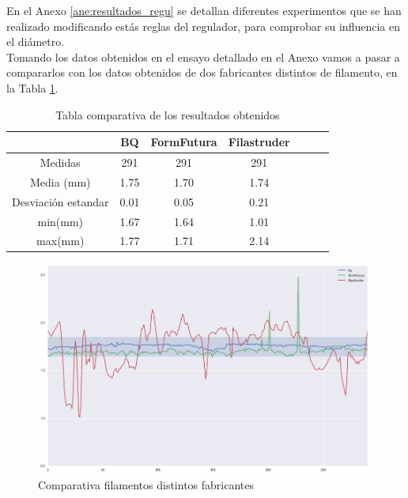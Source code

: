 En el Anexo \ref{ane:resultados_regu} se detallan diferentes experimentos que se han realizado modificando estás reglas del regulador, para comprobar su influencia en el diámetro.\\

Tomando los datos obtenidos en el ensayo detallado en el Anexo  vamos a pasar a compararlos con los datos obtenidos de dos fabricantes distintos de filamento, en la Tabla \ref{tab:compara_results}.

\begin{table}[H]
	\centering
	\begin{tabular}{ccccccc}
		                    & BQ & FormFutura & Filastruder \\ \hline
		Medidas             & 291      &291       & 291      \\
		Media (mm)          & 1.75     & 1.70     & 1.74      \\
		Desviación estandar & 0.01     & 0.05     & 0.21      \\
		min(mm)             & 1.67     & 1.64     & 1.01      \\
		max(mm)             & 1.77     & 1.71     & 2.14     
	\end{tabular}
	\caption{Tabla comparativa de los resultados obtenidos}
	\label{tab:compara_results}
\end{table}

\begin{figure}[H]
    \centering
    \includegraphics[width=0.99\textwidth]{images/producciones/conclusiones/output_8_1.png}
    \caption{Comparativa filamentos distintos fabricantes}
    \label{fig:concl_graf5}
\end{figure}

